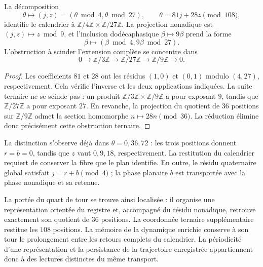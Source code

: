 \begin{proposition}
\label{ins29:xii:extension}
La décomposition
\[
 \theta\longmapsto(j,z)=(\theta\bmod4,\theta\bmod27),
 \qquad \theta=81j+28z\pmod{108},
\]
identifie le calendrier à
\(\mathbb Z/4\mathbb Z\times\mathbb Z/27\mathbb Z\).
La projection nonadique est \((j,z)\mapsto z\bmod9\), et l’inclusion
dodécaphasique \(\beta\mapsto9\beta\) prend la forme
\[
 \beta\longmapsto(\beta\bmod4,9\beta\bmod27).
\]
L’obstruction à scinder l’extension complète se concentre dans
\[
 0\longrightarrow\mathbb Z/3\mathbb Z
 \longrightarrow\mathbb Z/27\mathbb Z
 \longrightarrow\mathbb Z/9\mathbb Z\longrightarrow0.
\]
\end{proposition}
\begin{proof}
Les coefficients \(81\) et \(28\) ont les résidus \((1,0)\) et \((0,1)\)
modulo \((4,27)\), respectivement. Cela vérifie l’inverse et les deux
applications indiquées. La suite ternaire ne se scinde pas : un produit
\(\mathbb Z/3\mathbb Z\times\mathbb Z/9\mathbb Z\) a pour exposant
\(9\), tandis que \(\mathbb Z/27\mathbb Z\) a pour exposant \(27\).
En revanche, la projection du quotient de \(36\) positions sur
\(\mathbb Z/9\mathbb Z\) admet la section homomorphe
\(n\mapsto28n\pmod{36}\). La réduction élimine donc précisément
cette obstruction ternaire.
\end{proof}

La distinction s’observe déjà dans \(\theta=0,36,72\) : les trois positions
donnent \(r=b=0\), tandis que \(z\) vaut \(0,9,18\), respectivement.
La restitution du calendrier requiert de conserver la fibre que le plan
identifie. En outre, le résidu quaternaire global satisfait
\(j=r+b\pmod4\) ; la phase planaire \(b\) est transportée avec la phase
nonadique et sa retenue.

La portée du quart de tour se trouve ainsi localisée : il organise une
représentation orientée du registre et, accompagné du résidu nonadique,
retrouve exactement son quotient de \(36\) positions. La coordonnée
ternaire supplémentaire restitue les \(108\) positions. La mémoire de la
dynamique enrichie conserve à son tour le prolongement entre les retours
complets du calendrier. La périodicité d’une représentation et la
persistance de la trajectoire enregistrée appartiennent donc à des lectures distinctes
du même transport.

